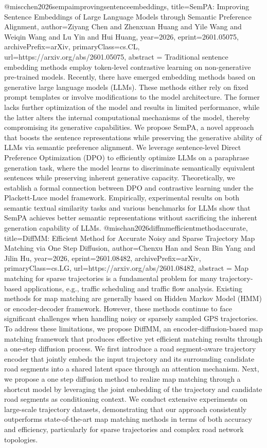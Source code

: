 {}@misc{chen2026sempaimprovingsentenceembeddings,
      title={SemPA: Improving Sentence Embeddings of Large Language Models through Semantic Preference Alignment}, 
      author={Ziyang Chen and Zhenxuan Huang and Yile Wang and Weiqin Wang and Lu Yin and Hui Huang},
      year={2026},
      eprint={2601.05075},
      archivePrefix={arXiv},
      primaryClass={cs.CL},
      url={https://arxiv.org/abs/2601.05075},
      abstract = {Traditional sentence embedding methods employ token-level contrastive learning on non-generative pre-trained models. Recently, there have emerged embedding methods based on generative large language models (LLMs). These methods either rely on fixed prompt templates or involve modifications to the model architecture. The former lacks further optimization of the model and results in limited performance, while the latter alters the internal computational mechanisms of the model, thereby compromising its generative capabilities. We propose SemPA, a novel approach that boosts the sentence representations while preserving the generative ability of LLMs via semantic preference alignment. We leverage sentence-level Direct Preference Optimization (DPO) to efficiently optimize LLMs on a paraphrase generation task, where the model learns to discriminate semantically equivalent sentences while preserving inherent generative capacity. Theoretically, we establish a formal connection between DPO and contrastive learning under the Plackett-Luce model framework. Empirically, experimental results on both semantic textual similarity tasks and various benchmarks for LLMs show that SemPA achieves better semantic representations without sacrificing the inherent generation capability of LLMs.}
}@misc{han2026diffmmefficientmethodaccurate,
      title={DiffMM: Efficient Method for Accurate Noisy and Sparse Trajectory Map Matching via One Step Diffusion}, 
      author={Chenxu Han and Sean Bin Yang and Jilin Hu},
      year={2026},
      eprint={2601.08482},
      archivePrefix={arXiv},
      primaryClass={cs.LG},
      url={https://arxiv.org/abs/2601.08482},
      abstract = {Map matching for sparse trajectories is a fundamental problem for many trajectory-based applications, e.g., traffic scheduling and traffic flow analysis. Existing methods for map matching are generally based on Hidden Markov Model (HMM) or encoder-decoder framework. However, these methods continue to face significant challenges when handling noisy or sparsely sampled GPS trajectories. To address these limitations, we propose DiffMM, an encoder-diffusion-based map matching framework that produces effective yet efficient matching results through a one-step diffusion process. We first introduce a road segment-aware trajectory encoder that jointly embeds the input trajectory and its surrounding candidate road segments into a shared latent space through an attention mechanism. Next, we propose a one step diffusion method to realize map matching through a shortcut model by leveraging the joint embedding of the trajectory and candidate road segments as conditioning context. We conduct extensive experiments on large-scale trajectory datasets, demonstrating that our approach consistently outperforms state-of-the-art map matching methods in terms of both accuracy and efficiency, particularly for sparse trajectories and complex road network topologies.}
}
